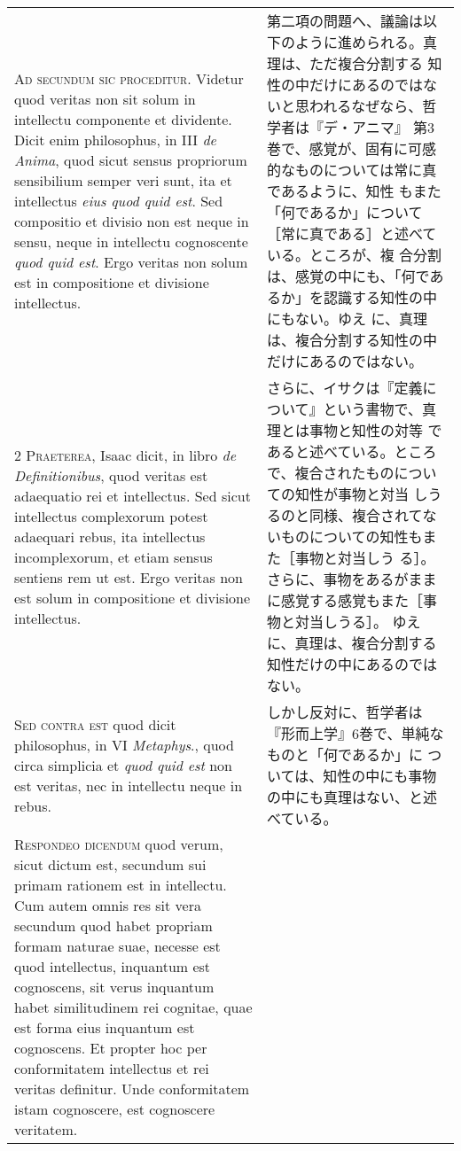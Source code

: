 \documentclass[10pt]{jsarticle} %
\begin{document}
\begin{longtable}{p{21em}p{21em}}

{\huge A}{\scshape d secundum sic proceditur}. Videtur quod veritas non
sit solum in intellectu componente et dividente. Dicit enim philosophus,
in III {\itshape de Anima}, quod sicut sensus propriorum sensibilium
semper veri sunt, ita et intellectus {\itshape eius quod quid est}. Sed
compositio et divisio non est neque in sensu, neque in intellectu
cognoscente {\itshape quod quid est}. Ergo veritas non solum est in
compositione et divisione intellectus.

&

第二項の問題へ、議論は以下のように進められる。真理は、ただ複合分割する
知性の中だけにあるのではないと思われるなぜなら、哲学者は『デ・アニマ』
第3巻で、感覚が、固有に可感的なものについては常に真であるように、知性
もまた「何であるか」について［常に真である］と述べている。ところが、複
合分割は、感覚の中にも、「何であるか」を認識する知性の中にもない。ゆえ
に、真理は、複合分割する知性の中だけにあるのではない。

 \\


{\scshape 2 Praeterea}, Isaac dicit, in libro {\itshape de
Definitionibus}, quod veritas est adaequatio rei et intellectus. Sed
sicut intellectus complexorum potest adaequari rebus, ita intellectus
incomplexorum, et etiam sensus sentiens rem ut est. Ergo veritas non
est solum in compositione et divisione intellectus.

&

さらに、イサクは『定義について』という書物で、真理とは事物と知性の対等
であると述べている。ところで、複合されたものについての知性が事物と対当
しうるのと同様、複合されてないものについての知性もまた［事物と対当しう
る］。さらに、事物をあるがままに感覚する感覚もまた［事物と対当しうる］。
ゆえに、真理は、複合分割する知性だけの中にあるのではない。

\\

{\scshape Sed contra est} quod dicit philosophus, in VI {\itshape
Metaphys}., quod circa simplicia et {\itshape quod quid est} non est
veritas, nec in intellectu neque in rebus.

&

しかし反対に、哲学者は『形而上学』6巻で、単純なものと「何であるか」に
 ついては、知性の中にも事物の中にも真理はない、と述べている。

\\

{\scshape Respondeo dicendum} quod verum, sicut dictum est, secundum
sui primam rationem est in intellectu. Cum autem omnis res sit vera
secundum quod habet propriam formam naturae suae, necesse est quod
intellectus, inquantum est cognoscens, sit verus inquantum habet
similitudinem rei cognitae, quae est forma eius inquantum est
cognoscens. Et propter hoc per conformitatem intellectus et rei
veritas definitur. Unde conformitatem istam cognoscere, est cognoscere
veritatem.



\end{longtable}
\end{document}
